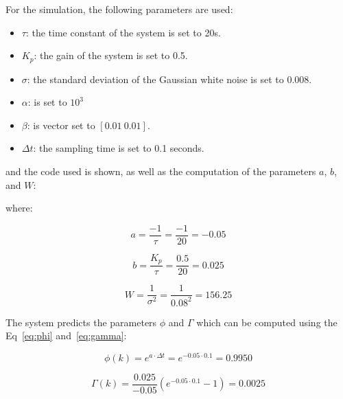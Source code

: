 

For the simulation, the following parameters are used:

\begin{itemize}
    \item $\tau$: the time constant of the system is set to 20s.

    \item $K_{p}$: the gain of the system is set to 0.5.

    \item $\sigma$: the standard deviation of the Gaussian white noise is set to 0.008.

    \item $\alpha$: is set to $10^{3}$

    \item $\beta$: is vector set to $\left[ 0.01 ~ 0.01 \right]$.

    \item $\Delta t$: the sampling time is set to 0.1 seconds.
\end{itemize}

and the code used is shown, as well as the computation of the parameters $a$, $b$, and $W$:



where:

\begin{equation}
    a = \frac{-1}{\tau} = \frac{-1}{20} = -0.05
\end{equation}

\begin{equation}
    b = \frac{K_{p}}{\tau} = \frac{0.5}{20} = 0.025
\end{equation}

\begin{equation}
    W = \frac{1}{\sigma^{2}} = \frac{1}{0.08^{2}} = 156.25
\end{equation}

The system predicts the parameters $\phi$ and $\Gamma$ which can be computed using the Eq~\ref{eq:phi} and~\ref{eq:gamma}:

\begin{equation}
    \phi(k) = e^{a \cdot \Delta t} = e^{-0.05 \cdot 0.1} = 0.9950
\end{equation}

\begin{equation}
    \Gamma(k) = \frac{0.025}{-0.05} \left( e^{-0.05 \cdot 0.1} - 1\right) = 0.0025
\end{equation}

